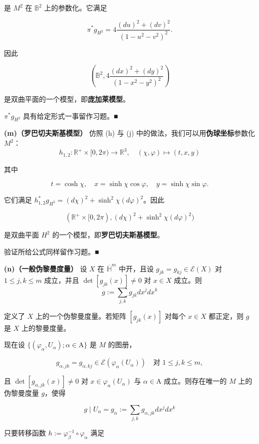 \begin{example}
是 $ M^2 $ 在 $ \mathbb{B}^2 $ 上的参数化。它满足

\[
\pi^* g_{H^2} = 4\frac{(du)^2+(dv)^2}{(1-u^2-v^2)^2}.
\]

因此

\[
\left( \mathbb{B}^2, 4\frac{(dx)^2+(dy)^2}{(1-x^2-y^2)^2} \right)
\]

是双曲平面的一个模型，即\textbf{庞加莱模型}。

\proofhead
$ \pi^* g_{H^2} $ 具有给定形式一事留作习题。\nobreak\hspace{0.35em}■

\textbf{(m)（罗巴切夫斯基模型）} 仿照 (h) 与 (j) 中的做法，我们可以用\textbf{伪球坐标}参数化 $ M^2 $：
\[
h_{1,2} : \mathbb{R}^+ \times [0, 2\pi) \to \mathbb{R}^3, \quad (\chi, \varphi) \mapsto (t, x, y)
\]

其中

\[
t = \cosh\chi, \quad x = \sinh\chi \cos\varphi, \quad y = \sinh\chi \sin\varphi.
\]

它们满足 $ h^*_{1,2} g_{H^3} = (d\chi)^2 + \sinh^2\chi (d\varphi)^2 $。因此

\[
(\mathbb{R}^+ \times [0, 2\pi), (d\chi)^2 + \sinh^2\chi (d\varphi)^2)
\]

是双曲平面 $ H^2 $ 的一个模型，即\textbf{罗巴切夫斯基模型}。

\proofhead
验证所给公式同样留作习题。\nobreak\hspace{0.35em}■

\textbf{(n)（一般伪黎曼度量）} 设 $ X $ 在 $ \overline{\mathbb{H}}^m $ 中开，且设 $ g_{jk} = g_{kj} \in \mathcal{E}(X) $ 对 $ 1 \le j,k \le m $ 成立，并且 $ \det[g_{jk}(x)] \ne 0 $ 对 $ x \in X $ 成立。则
\[
g := \sum_{j,k} g_{jk} dx^j dx^k
\]

定义了 $ X $ 上的一个伪黎曼度量。若矩阵 $ [g_{jk}(x)] $ 对每个 $ x \in X $ 都正定，则 $ g $ 是 $ X $ 上的黎曼度量。

现在设 $ \{ (\varphi_\alpha, U_\alpha) ; \alpha \in \mathrm{A} \} $ 是 $ M $ 的图册，

\[
g_{\alpha,jk} = g_{\alpha,kj} \in \mathcal{E}(\varphi_\alpha(U_\alpha)) \quad \text{对 } 1 \le j,k \le m,
\]

且 $ \det[g_{\alpha,jk}(x)] \ne 0 $ 对 $ x \in \varphi_\alpha(U_\alpha) $ 与 $ \alpha \in \mathrm{A} $ 成立。则存在唯一的 $ M $ 上的伪黎曼度量 $ g $，使得

\[
g\mid U_\alpha = g_\alpha := \sum_{j,k} g_{\alpha,jk} dx^j dx^k
\]

只要转移函数 $ h := \varphi_\beta^{-1} \circ \varphi_\alpha $ 满足


\end{example}
